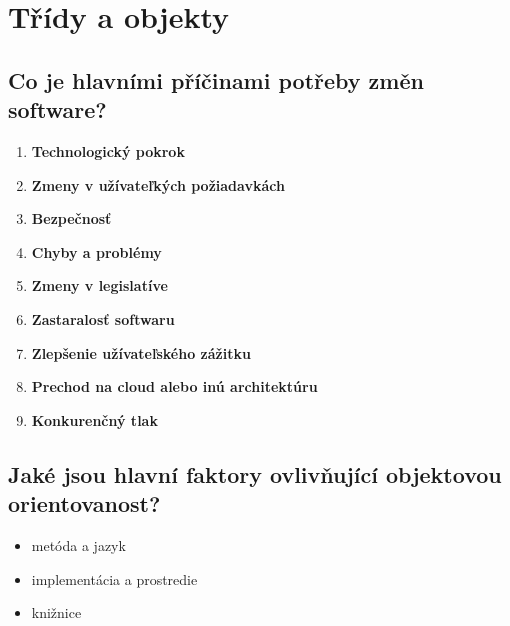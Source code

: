 \section{Třídy a objekty}


\subsection{Co je hlavními příčinami potřeby změn software?}
\begin{enumerate}
    \item \textbf{Technologický pokrok}
    \item \textbf{Zmeny v užívateľkých požiadavkách}
    \item \textbf{Bezpečnosť}
    \item \textbf{Chyby a problémy}
    \item \textbf{Zmeny v legislatíve}
    \item \textbf{Zastaralosť softwaru}
    \item \textbf{Zlepšenie užívateľského zážitku}
    \item \textbf{Prechod na cloud alebo inú architektúru}
    \item \textbf{Konkurenčný tlak}
\end{enumerate}

\subsection{Jaké jsou hlavní faktory ovlivňující objektovou orientovanost?}
\begin{itemize}
    \item metóda a jazyk
    \item implementácia a prostredie
    \item knižnice
\end{itemize}


